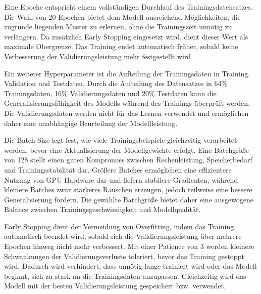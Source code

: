 Eine Epoche entspricht einem vollständigen Durchlauf des Trainingsdatensatzes. Die Wahl von 20 Epochen bietet dem Modell ausreichend Möglichkeiten, die zugrunde liegenden Muster zu erlernen, ohne die Trainingszeit unnötig zu verlängern. Da zusätzlich Early Stopping eingesetzt wird, dient dieser Wert als maximale Obergrenze. Das Training endet automatisch früher, sobald keine Verbesserung der Validierungsleistung mehr festgestellt wird.

Ein weiterer Hyperparameter ist die Aufteilung der Trainingsdaten in Training, Validation und Testdaten. Durch die Aufteilung des Datensatzes in 64\% Trainingsdaten, 16\% Validierungsdaten und 20\% Testdaten kann die Generalisierungsfähigkeit des Modells während des Trainings überprüft werden. Die Validierungsdaten werden nicht für das Lernen verwendet und ermöglichen daher eine unabhängige Beurteilung der Modellleistung.

Die Batch Size legt fest, wie viele Trainingsbeispiele gleichzeitig verarbeitet werden, bevor eine Aktualisierung der Modellgewichte erfolgt. Eine Batchgröße von 128 stellt einen guten Kompromiss zwischen Rechenleistung, Speicherbedarf und Trainingsstabilität dar. Größere Batches ermöglichen eine effizientere Nutzung von GPU Hardware dar und liefern stabilere Gradienten, während kleinere Batches zwar stärkeres Rauschen erzeugen, jedoch teilweise eine bessere Generalisierung fördern. Die gewählte Batchgröße bietet daher eine ausgewogene Balance zwischen Trainingsgeschwindigkeit und Modellqualität.

Early Stopping dient der Vermeidung von Overfitting, indem das Training automatisch beendet wird, sobald sich die Validierungsleistung über mehrere Epochen hinweg nicht mehr verbessert. Mit einer Patience von 3 werden kleinere Schwankungen der Validierungsverluste toleriert, bevor das Training gestoppt wird. Dadurch wird verhindert, dass unnötig lange trainiert wird oder das Modell beginnt, sich zu stark an die Trainingsdaten anzupassen. Gleichzeitig wird das Modell mit der besten Validierungsleistung gespeichert bzw. verwendet.

